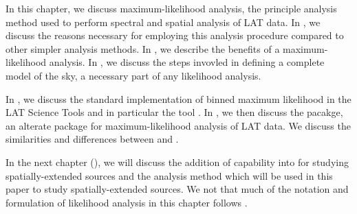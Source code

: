 In this chapter, we discuss maximum-likelihood analysis, the principle
analysis method used to perform spectral and spatial analysis of
LAT data.  In , we discuss the
reasons necessary for employing this analysis procedure compared to other
simpler analysis methods.  In ,
we describe the benefits of a maximum-likelihood analysis.
In , we discuss the steps invovled in defining
a complete model of the sky, a necessary part of any likelihood analysis.

In , we discuss the standard implementation
of binned maximum likelihood in the LAT Science Tools and in particular
the tool \gtlike.  In , we then discuss the
\pointlike pacakge, an alterate package for maximum-likelihood analysis of
LAT data. We discuss the similarities and differences between \pointlike
and \gtlike.

In the next chapter (), we will discuss the
addition of capability into \pointlike for studying spatially-extended
sources and the analysis method which will be used in this paper to
study spatially-extended sources.  We not that much of the notation
and formulation of likelihood analysis in this chapter follows
\cite{kerr_2010a_likelihood-methods}.


